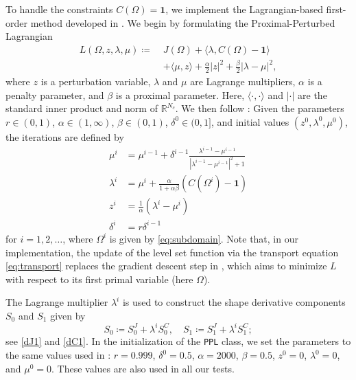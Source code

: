 \documentclass[iicol,pdflatex,sn-mathphys-ay]{sn-jnl}%
\theoremstyle{thmstyleone}%
\theoremstyle{thmstyletwo}%
\theoremstyle{thmstylethree}%
\begin{document}
To handle the constraints $C(\Omega)=\boldsymbol{1}$,
we implement the Lagrangian-based first-order method
developed in \cite{MR4589221}.
We begin by formulating the Proximal-Perturbed Lagrangian
\[
\begin{aligned}
	L(\Omega,z,\lambda,\mu) \coloneqq\;
	& J(\Omega)+\langle\lambda, C(\Omega)-\boldsymbol{1}\rangle\\
	& +\langle \mu, z \rangle+ \frac{\alpha}{2}|z|^2 +
	\frac{\beta}{2}|\lambda-\mu|^2,
\end{aligned}
\]
where $z$ is a perturbation variable,
$\lambda$ and $\mu$ are Lagrange multipliers,
$\alpha$ is a penalty parameter, and
$\beta$ is a proximal parameter.
Here, $\langle \cdot, \cdot \rangle$ and $\vert \cdot \vert$
are the standard inner product and norm of $\mathds{R}^{N_c}$.
We then follow \cite[Algorithm~1]{MR4589221}:
Given the parameters 
$r\in(0,1)$,
$\alpha\in(1,\infty)$, $\beta\in(0,1)$, 
$\delta^{0}\in(0,1]$, and initial values
$(z^{0},\lambda^{0},\mu^{0})$,
the iterations are defined by
\begin{equation}\label{eq:lag_method}
\begin{aligned}
	\mu^{i} &= \mu^{i-1}+\delta^{i-1}
	\tfrac{\lambda^{i-1}-\mu^{i-1}}{|\lambda^{i-1}-\mu^{i-1}|^{2} + 1}\\
	\lambda^{i} &= \mu^{i}+
	\tfrac{\alpha}{1+\alpha\beta}(C(\Omega^{i})-\boldsymbol{1})\\
	z^{i} &= \tfrac{1}{\alpha}(\lambda^{i}-\mu^{i})\\
	\delta^{i} &=r\delta^{i-1}
\end{aligned}
\end{equation}
for $i=1,2,\dots$, where $\Omega^{i}$ is given by \eqref{eq:subdomain}.
Note that, in our implementation, the update of the level set function
via the transport equation \eqref{eq:transport}
replaces the gradient descent step in \cite[Algorithm~1]{MR4589221},
which aims to minimize $L$ with respect
to its first primal variable (here $\Omega$).

The Lagrange multiplier $\lambda^i$ is used to construct
the shape derivative components $S_0$ and $S_1$ given by
\begin{equation}\label{eq:S0andS1}
	S_0\coloneqq S_0^{J} + \lambda^{i} S_0^{C},
	\quad
	S_1\coloneqq S_1^{J} + \lambda^{i} S_1^{C}; 	
\end{equation}
see \eqref{dJ1} and \eqref{dC1}.
In the initialization of the \texttt{PPL} class,
we set the parameters to the same values used in \cite{MR4589221}:
$r = 0.999$, $\delta^{0} = 0.5$,
$\alpha = 2000$, $\beta = 0.5$,
$z^{0} = 0$, $\lambda^{0} = 0$, and $\mu^{0} = 0$.
These values are also used in all our tests.
\end{document}
